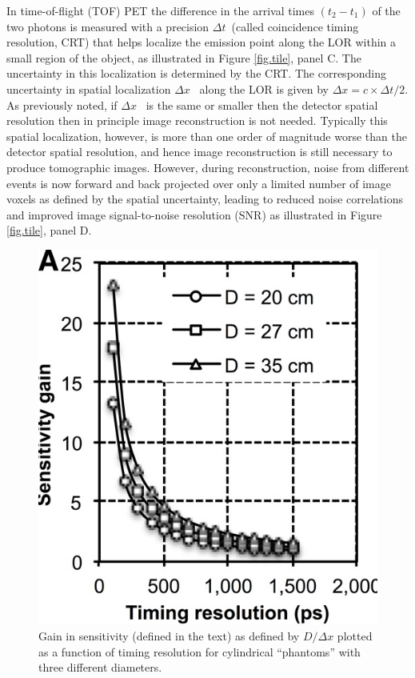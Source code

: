 In time-of-flight (TOF) PET the difference in the arrival times $(t_2 - t_1)$ of the two photons is measured with a precision $\Delta t$~(called coincidence timing resolution, CRT) that helps localize the emission point along the LOR within a small region of the object, as illustrated in  Figure \ref{fig.tile}, panel C. The uncertainty in this localization is determined by the CRT. The corresponding uncertainty in spatial localization $\Delta x$~ along the LOR is given by 
$\Delta x=c \times \Delta t/2$. As previously noted, if $\Delta x$~ is the same or smaller then the detector spatial resolution then in principle image reconstruction is not needed. Typically this spatial localization, however, is more than one order of magnitude worse than the detector spatial resolution, and hence image reconstruction is still necessary to produce tomographic images. However, during reconstruction, noise from different events is now forward and back projected over only a limited number of image voxels as defined by the spatial uncertainty, leading to reduced noise correlations and improved image signal-to-noise resolution (SNR) as illustrated in  Figure \ref{fig.tile}, panel D.


\begin{figure}[!bhtp]
	\centering
	\includegraphics[scale=0.5]{img/SensiTof.png}
	\caption{\label{fig.sensi} Gain in sensitivity (defined in the text) as defined by $D/\Delta x$ plotted as a function of timing resolution for cylindrical ``phantoms'' with three different diameters.}
\end{figure}


